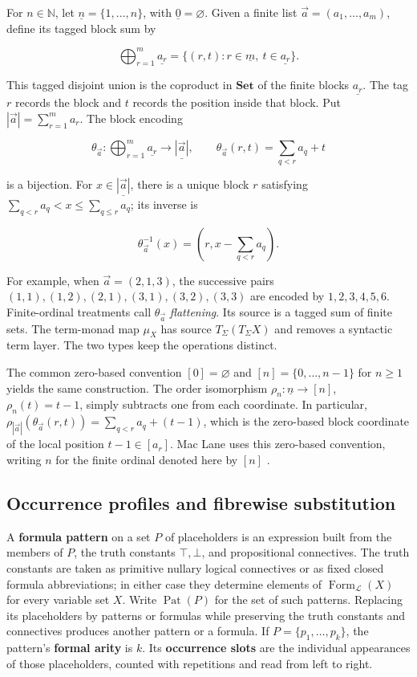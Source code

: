 \documentclass[11pt]{article}
\newcommand{\finord}[1]{\underline{#1}}
\begin{document}
For \(n\in\mathbb N\), let
\(\finord n=\{1,\ldots,n\}\), with
\(\finord0=\varnothing\). Given a finite list
\(\vec a=(a_1,\ldots,a_m)\), define its tagged block sum by

\[
\bigoplus_{r=1}^{m}\finord{a_r}
=\{(r,t):r\in\finord m,\ t\in\finord{a_r}\}.
\]

This tagged disjoint union is the coproduct in \(\mathbf{Set}\) of the finite
blocks \(\finord{a_r}\).
The tag \(r\) records the block and \(t\) records the position inside that
block. Put \(|\vec a|=\sum_{r=1}^{m}a_r\). The block encoding

\[
\theta_{\vec a}:
\bigoplus_{r=1}^{m}\finord{a_r}
\longrightarrow \finord{|\vec a|},
\qquad
\theta_{\vec a}(r,t)=\sum_{q<r}a_q+t
\]

is a bijection. For \(x\in\finord{|\vec a|}\), there is a unique block
\(r\) satisfying
\(\sum_{q<r}a_q<x\leq\sum_{q\leq r}a_q\); its inverse is

\[
\theta_{\vec a}^{-1}(x)
=\left(r,x-\sum_{q<r}a_q\right).
\]

For example, when \(\vec a=(2,1,3)\), the successive pairs
\((1,1),(1,2),(2,1),(3,1),(3,2),(3,3)\) are encoded by
\(1,2,3,4,5,6\). Finite-ordinal treatments call \(\theta_{\vec a}\)
\emph{flattening}. Its source is a tagged sum of finite sets. The term-monad
map \(\mu_X\) has source \(T_\Sigma(T_\Sigma X)\) and removes a syntactic term
layer. The two types keep the operations distinct.

The common zero-based convention
\([0]=\varnothing\) and \([n]=\{0,\ldots,n-1\}\) for \(n\geq 1\)
yields the same construction. The order isomorphism
\(\rho_n:\finord n\to[n]\), \(\rho_n(t)=t-1\), simply subtracts one from
each coordinate. In particular,
\(\rho_{|\vec a|}(\theta_{\vec a}(r,t))
=\sum_{q<r}a_q+(t-1)\), which is the zero-based block coordinate of the
local position \(t-1\in[a_r]\). Mac Lane uses this zero-based convention,
writing \(n\) for the finite ordinal denoted here by \([n]\)
\cite[\S VII.5]{MacLane}.

\subsection{Occurrence profiles and fibrewise substitution}

A \textbf{formula pattern} on a set \(P\) of placeholders is
an expression built from the members of \(P\), the truth constants
\(\top,\bot\), and propositional connectives. The truth constants are taken as
primitive nullary logical connectives or as fixed closed formula
abbreviations; in either case they determine elements of
\(\operatorname{Form}_{\mathcal L}(X)\) for every variable set \(X\). Write
\(\operatorname{Pat}(P)\) for the set of such patterns. Replacing its
placeholders by patterns or formulas while preserving the truth constants and
connectives produces another pattern or a formula. If
\(P=\{p_1,\ldots,p_k\}\), the pattern's \textbf{formal arity} is \(k\). Its
\textbf{occurrence slots} are the individual appearances of those
placeholders, counted with repetitions and read from left to right.
\end{document}
